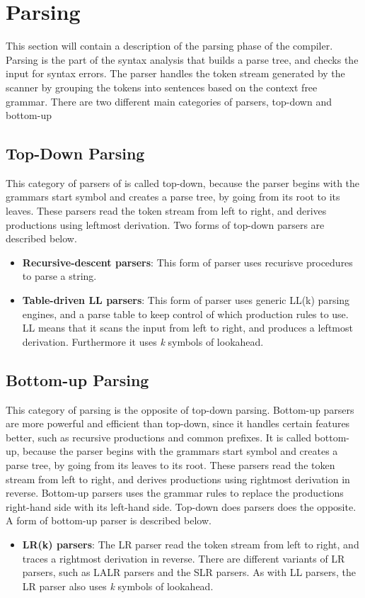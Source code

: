 \section{Parsing}
This section will contain a description of the parsing phase of the compiler. 
\\Parsing is the part of the syntax analysis that builds a parse tree, and checks the input for syntax errors. The parser handles the token stream generated by the scanner by grouping the tokens into sentences based on the context free grammar. There are two different main categories of parsers, top-down and bottom-up

\subsection{Top-Down Parsing}
This category of parsers of is called top-down, because the parser begins with the grammars start symbol and creates a parse tree, by going from its root to its leaves. These parsers read the token stream from left to right, and derives productions using leftmost derivation. Two forms of top-down parsers are described below. 

\begin{itemize}
\item \textbf{Recursive-descent parsers}: This form of parser uses recurisve procedures to parse a string. 
\item \textbf{Table-driven LL parsers}: This form of parser uses generic LL(k) parsing engines, and a parse table to keep control of which production rules to use. LL means that it scans the input from left to right, and produces a leftmost derivation. Furthermore it uses \textit{k} symbols of lookahead. 
\end{itemize}

\subsection{Bottom-up Parsing}
This category of parsing is the opposite of top-down parsing. Bottom-up parsers are more powerful and efficient than top-down, since it handles certain features better, such as recursive productions and common prefixes. It is called bottom-up, because the parser begins with the grammars start symbol and creates a parse tree, by going from its leaves to its root. These parsers read the token stream from left to right, and derives productions using rightmost derivation in reverse. Bottom-up parsers uses the grammar rules to replace the productions right-hand side with its left-hand side. Top-down does parsers does the opposite. A form of bottom-up parser is described below. 

\begin{itemize}
\item \textbf{LR(k) parsers}: The LR parser read the token stream from left to right, and traces a rightmost derivation in reverse. There are different variants of LR parsers, such as LALR parsers and the SLR parsers. As with LL parsers, the LR parser also uses \textit{k} symbols of lookahead.  
\end{itemize}
